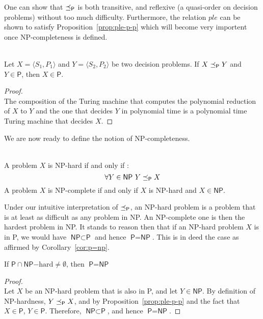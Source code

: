 One can show that \(\preceq_\textsf{P}\) is both transitive, and reflexive (a quasi-order on decision problems) without too much difficulty. Furthermore, the relation \(ple\) can be shown to satisfy Proposition~\ref{prop:ple-p-p} which will become very importent once \textsf{NP}-completeness is defined.
\begin{proposition}\ \\
    \label{prop:ple-p-p}
    Let \(X = \langle S_1, P_1\rangle\) and \(Y =\langle S_2, P_2\rangle\) be two decision problems. If \(X \preceq_\textsf{P} Y\) and \(Y \in \textsf{P}\), then \(X \in \textsf{P}\).
\end{proposition}
\begin{proof}\ \\
    The composition of the Turing machine that computes the polynomial reduction of \(X\) to \(Y\) and the one that decides \(Y\) in polynomial time is a polynomial time Turing machine that decides \(X\).
\end{proof}

We are now ready to define the notion of \textsf{NP}-completeness.
\begin{definition}\ \\
    A problem \(X\) is \textsf{NP}-hard if and only if :
    \[\forall Y \in \textsf{NP}\ Y \preceq_\textsf{P} X\]
    A problem \(X\) is \textsf{NP}-complete if and only if \(X\) is \textsf{NP}-hard and \(X\in\textsf{NP}\).
\end{definition}

Under our intuitive interpretation of \(\preceq_\textsf{P}\), an \textsf{NP}-hard problem is a problem that is at least as difficult as any problem in \textsf{NP}. An \textsf{NP}-complete one is then the hardest problem in \textsf{NP}. It stands to reason then that if an \textsf{NP}-hard problem \(X\) is in \textsf{P}, we would have \(\textsf{NP} \subset \textsf{P}\) and hence \(\textsf{P}= \textsf{NP}\). This is in deed the case as affirmed by Corollary~\ref{cor:p=np}.

\begin{corollary}
    \label{cor:p=np}
    If \(\textsf{P} \cap \textsf{NP}\mathrm{-hard} \neq \emptyset\), then \(\textsf{P}=\textsf{NP}\)
\end{corollary}

\begin{proof}\ \\
    Let \(X\) be an \textsf{NP}-hard problem that is also in \textsf{P}, and let \(Y\in\textsf{NP}\). By definition of \textsf{NP}-hardness, \(Y\preceq_\textsf{P} X\), and by Proposition~\ref{prop:ple-p-p} and the fact that \(X\in\textsf{P}\), \(Y\in\textsf{P}\).
    Therefore, \(\textsf{NP} \subset \textsf{P}\), and hence \(\textsf{P}=\textsf{NP}\).
\end{proof}

